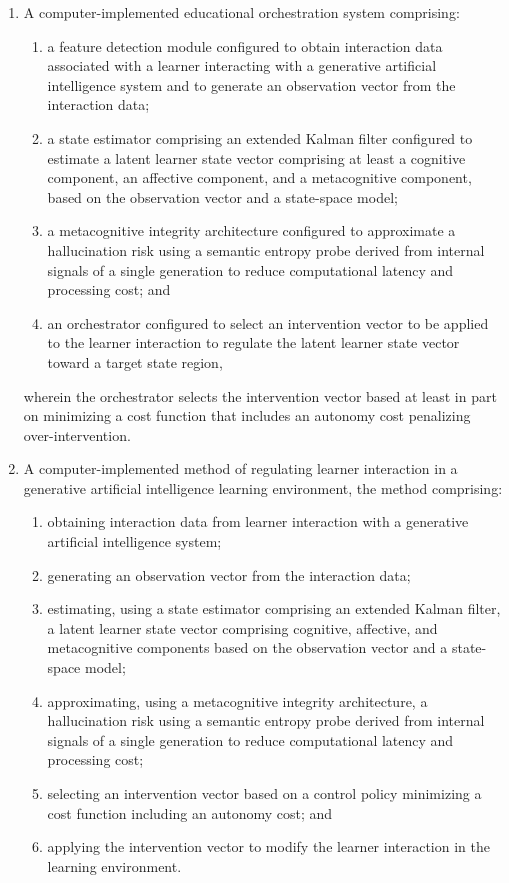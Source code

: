 \documentclass[12pt]{article}
\begin{document}
\begin{enumerate}[label=\arabic*., leftmargin=*, itemsep=6pt]
  \item A computer-implemented educational orchestration system comprising:
  \begin{enumerate}[label=(\alph*), leftmargin=*, itemsep=4pt]
    \item a feature detection module configured to obtain interaction data associated with a learner interacting with a generative artificial intelligence system and to generate an observation vector from the interaction data;
    \item a state estimator comprising an extended Kalman filter configured to estimate a latent learner state vector comprising at least a cognitive component, an affective component, and a metacognitive component, based on the observation vector and a state-space model;
    \item a metacognitive integrity architecture configured to approximate a hallucination risk using a semantic entropy probe derived from internal signals of a single generation to reduce computational latency and processing cost; and
    \item an orchestrator configured to select an intervention vector to be applied to the learner interaction to regulate the latent learner state vector toward a target state region,
  \end{enumerate}
  wherein the orchestrator selects the intervention vector based at least in part on minimizing a cost function that includes an autonomy cost penalizing over-intervention.

  \item A computer-implemented method of regulating learner interaction in a generative artificial intelligence learning environment, the method comprising:
  \begin{enumerate}[label=(\alph*), leftmargin=*, itemsep=4pt]
    \item obtaining interaction data from learner interaction with a generative artificial intelligence system;
    \item generating an observation vector from the interaction data;
    \item estimating, using a state estimator comprising an extended Kalman filter, a latent learner state vector comprising cognitive, affective, and metacognitive components based on the observation vector and a state-space model;
    \item approximating, using a metacognitive integrity architecture, a hallucination risk using a semantic entropy probe derived from internal signals of a single generation to reduce computational latency and processing cost;
    \item selecting an intervention vector based on a control policy minimizing a cost function including an autonomy cost; and
    \item applying the intervention vector to modify the learner interaction in the learning environment.
  \end{enumerate}
\end{enumerate}
\end{document}
